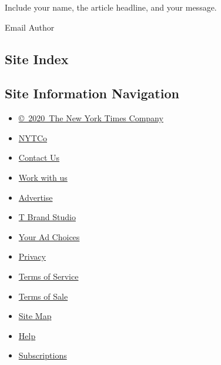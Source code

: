 Include your name, the article headline, and your message.

Email Author

\hypertarget{site-index}{%
\subsection{Site Index}\label{site-index}}

\hypertarget{site-information-navigation}{%
\subsection{Site Information
Navigation}\label{site-information-navigation}}

\begin{itemize}
\tightlist
\item
  \href{https://help.nytimes3xbfgragh.onion/hc/en-us/articles/115014792127-Copyright-notice}{©~2020~The
  New York Times Company}
\end{itemize}

\begin{itemize}
\tightlist
\item
  \href{https://www.nytco.com/}{NYTCo}
\item
  \href{https://help.nytimes3xbfgragh.onion/hc/en-us/articles/115015385887-Contact-Us}{Contact
  Us}
\item
  \href{https://www.nytco.com/careers/}{Work with us}
\item
  \href{https://nytmediakit.com/}{Advertise}
\item
  \href{http://www.tbrandstudio.com/}{T Brand Studio}
\item
  \href{https://www.nytimes3xbfgragh.onion/privacy/cookie-policy\#how-do-i-manage-trackers}{Your
  Ad Choices}
\item
  \href{https://www.nytimes3xbfgragh.onion/privacy}{Privacy}
\item
  \href{https://help.nytimes3xbfgragh.onion/hc/en-us/articles/115014893428-Terms-of-service}{Terms
  of Service}
\item
  \href{https://help.nytimes3xbfgragh.onion/hc/en-us/articles/115014893968-Terms-of-sale}{Terms
  of Sale}
\item
  \href{https://spiderbites.nytimes3xbfgragh.onion}{Site Map}
\item
  \href{https://help.nytimes3xbfgragh.onion/hc/en-us}{Help}
\item
  \href{https://www.nytimes3xbfgragh.onion/subscription?campaignId=37WXW}{Subscriptions}
\end{itemize}
